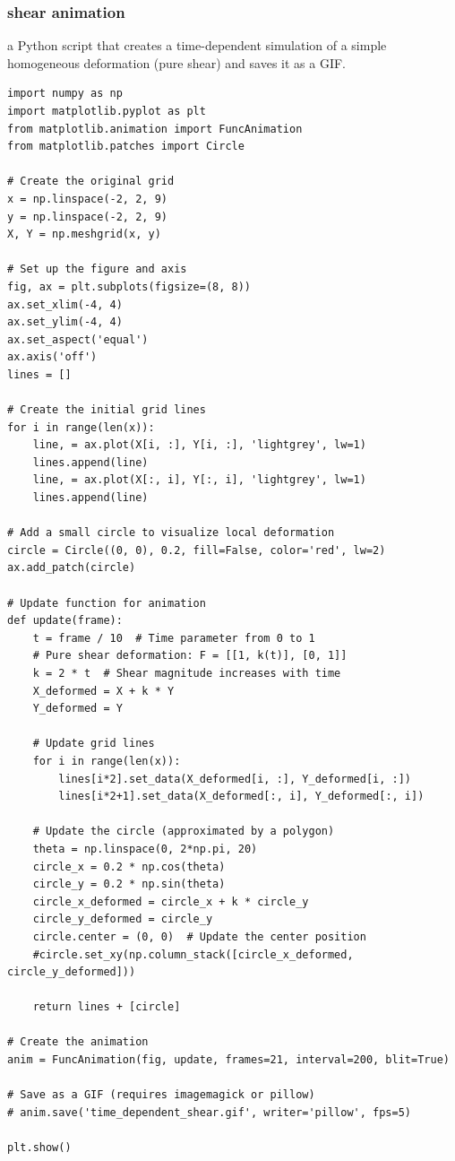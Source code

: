 \documentclass[11pt]{article}
\begin{document}
\subsubsection*{shear animation}
\label{sec:org08a4937}
a Python script that creates a time-dependent simulation of a simple homogeneous deformation (pure shear) and saves it as a GIF.
\begin{verbatim}
import numpy as np
import matplotlib.pyplot as plt
from matplotlib.animation import FuncAnimation
from matplotlib.patches import Circle

# Create the original grid
x = np.linspace(-2, 2, 9)
y = np.linspace(-2, 2, 9)
X, Y = np.meshgrid(x, y)

# Set up the figure and axis
fig, ax = plt.subplots(figsize=(8, 8))
ax.set_xlim(-4, 4)
ax.set_ylim(-4, 4)
ax.set_aspect('equal')
ax.axis('off')
lines = []

# Create the initial grid lines
for i in range(len(x)):
    line, = ax.plot(X[i, :], Y[i, :], 'lightgrey', lw=1)
    lines.append(line)
    line, = ax.plot(X[:, i], Y[:, i], 'lightgrey', lw=1)
    lines.append(line)

# Add a small circle to visualize local deformation
circle = Circle((0, 0), 0.2, fill=False, color='red', lw=2)
ax.add_patch(circle)

# Update function for animation
def update(frame):
    t = frame / 10  # Time parameter from 0 to 1
    # Pure shear deformation: F = [[1, k(t)], [0, 1]]
    k = 2 * t  # Shear magnitude increases with time
    X_deformed = X + k * Y
    Y_deformed = Y

    # Update grid lines
    for i in range(len(x)):
        lines[i*2].set_data(X_deformed[i, :], Y_deformed[i, :])
        lines[i*2+1].set_data(X_deformed[:, i], Y_deformed[:, i])

    # Update the circle (approximated by a polygon)
    theta = np.linspace(0, 2*np.pi, 20)
    circle_x = 0.2 * np.cos(theta)
    circle_y = 0.2 * np.sin(theta)
    circle_x_deformed = circle_x + k * circle_y
    circle_y_deformed = circle_y
    circle.center = (0, 0)  # Update the center position
    #circle.set_xy(np.column_stack([circle_x_deformed, circle_y_deformed]))

    return lines + [circle]

# Create the animation
anim = FuncAnimation(fig, update, frames=21, interval=200, blit=True)

# Save as a GIF (requires imagemagick or pillow)
# anim.save('time_dependent_shear.gif', writer='pillow', fps=5)

plt.show()   
\end{verbatim}
\end{document}
